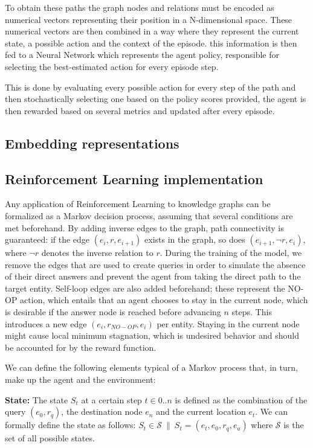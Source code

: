 To obtain these paths the graph nodes and relations must be encoded as numerical vectors representing their position in a N-dimensional space. 
These numerical vectors are then combined in a way where they represent the current state, a possible action and the context of the episode. this information is then fed to a Neural Network which represents the agent policy, responsible for selecting the best-estimated action for every episode step.

This is done by evaluating every possible action for every step of the path and then stochastically selecting one based on the policy scores provided, the agent is then rewarded based on several metrics and updated after every episode.

\subsection{Embedding representations}\label{sec:spacerl-embeddings}

\subsection{Reinforcement Learning implementation}\label{sec:spacerl-rlimplementation}

Any application of Reinforcement Learning to knowledge graphs can be formalized as a Markov decision process, assuming that several conditions are met beforehand. By adding inverse edges to the graph, path connectivity is guaranteed: if the edge $(e_i,r,e_{i+1})$ exists in the graph, so does $(e_{i+1},\neg r,e_i)$, where $\neg r$ denotes the inverse relation to $r$. During the training of the model, we remove the edges that are used to create queries in order to simulate the absence of their direct answers and prevent the agent from taking the direct path to the target entity. Self-loop edges are also added beforehand; these represent the NO-OP action, which entails that an agent chooses to stay in the current node, which is desirable if the answer node is reached before advancing $n$ steps. This introduces a new edge $(e_i,r_{NO-OP},e_i)$ per entity. Staying in the current node might cause local minimum stagnation, which is undesired behavior and should be accounted for by the reward function.

We can define the following elements typical of a Markov process that, in turn, make up the agent and the environment:

\textbf{State:} The state $S_t$ at a certain step $t \in 0..n$ is defined as the combination of the query $(e_0, r_q)$, the destination node $e_n$ and the current location $e_t$. We can formally define the state as follows: $S_t \in \mathcal{S} ~\|~ S_t = (e_t, e_0, r_q, e_a)$ where $\mathcal{S}$ is the set of all possible states.

